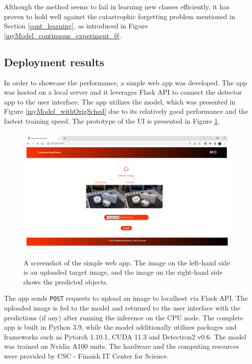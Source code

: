 Although the method seems to fail in learning new classes efficiently, it has proven to hold well against the catastrophic forgetting problem mentioned in Section \ref{cont_learning}, as introduced in Figure \ref{myModel_continuous_experiment_0}. 

\FloatBarrier
\clearpage
\subsection{Deployment results}
\FloatBarrier
In order to showcase the performance, a simple web app was developed. The app was hosted on a local server and it leverages Flask API to connect the detector app to the user interface. The app utilizes the model, which was presented in Figure \ref{myModel_withOrigSched} due to its relatively good performance and the fastest training speed. The prototype of the UI is presented in Figure \ref{demo}. 

\begin{figure}[htb]
	\begin{center}
		\includegraphics[width=14cm]{./demo.png}
	\end{center}
	\caption{A screenshot of the simple web app. The image on the left-hand side is an uploaded target image, and the image on the right-hand side shows the predicted objects.}
	\begin{center}
		\label{demo}
	\end{center}
\end{figure}

The app sends \texttt{POST} requests to upload an image to localhost via Flask API. The uploaded image is fed to the model and returned to the user interface with the predictions (if any) after running the inference on the CPU node. The complete app is built in Python 3.9, while the model additionally utilizes packages and frameworks such as Pytorch 1.10.1, CUDA 11.3 and Detectron2 v0.6. The model was trained on Nvidia A100 units. The hardware and the computing resources were provided by CSC - Finnish IT Center for Science. 
\FloatBarrier

\clearpage
